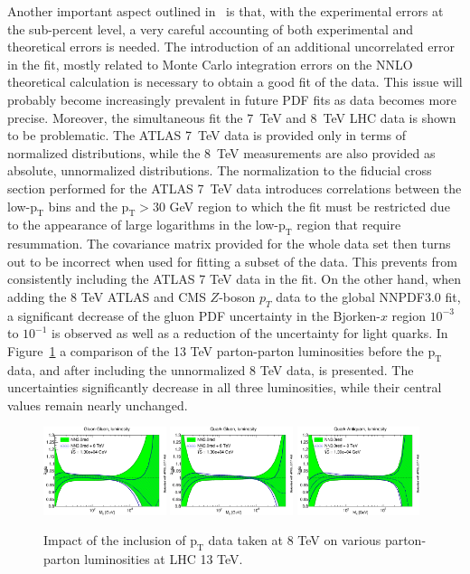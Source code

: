 \documentclass[a4paper,11pt,notoc]{article}
\newcommand{\pt}{\ensuremath{\mathrm{p_T}}}
\begin{document}
Another important aspect outlined in~\cite{Boughezal:2017nla} is that, 
with the experimental errors at the sub-percent level, a very careful 
accounting of both experimental and theoretical errors is needed. 
The introduction of an additional uncorrelated error in the fit, 
mostly related to Monte Carlo integration errors on the NNLO theoretical  
calculation is necessary to obtain a good fit of the data. 
This issue will probably become increasingly prevalent in future PDF 
fits as data becomes more precise.
%
Moreover, the simultaneous fit the 7~TeV and 8~TeV LHC data is shown to 
be problematic. 
The ATLAS 7~TeV data is provided only in terms of normalized distributions, 
while the 8~TeV measurements are also provided as absolute, unnormalized 
distributions. The normalization to the fiducial cross section performed 
for the ATLAS 7~TeV data introduces correlations between the low-$\pt$ 
bins and the $\pt>30$ GeV region to which the fit must be restricted due 
to the appearance of large logarithms in the low-$\pt$ region that require 
resummation.  
The covariance matrix provided for the whole data set then turns 
out to be incorrect when used for fitting a subset of the data. 
This prevents from consistently including the ATLAS 7 TeV data in the fit.
% 
On the other hand, when adding the 8 TeV ATLAS and CMS $Z$-boson $p_T$ data 
to the global NNPDF3.0 fit, a significant decrease of the gluon PDF 
uncertainty in the Bjorken-$x$ region $10^{-3}$ to $10^{-1}$ is observed
as well as a reduction of the uncertainty for light quarks.
In Figure~\ref{fig:lumi} a comparison of the 13 TeV parton-parton luminosities 
before the $\pt$ data, and after including the unnormalized 8 TeV data, 
is presented. The uncertainties significantly decrease in all three luminosities, 
while their central values remain nearly unchanged.
%
\begin{figure}[tbp]
        \centering
        \includegraphics[width=0.32\textwidth]{lumiGG_baselineP8tev.eps}
        \includegraphics[width=0.32\textwidth]{lumiQG_baselineP8tev.eps} 
        \includegraphics[width=0.32\textwidth]{lumiQQ_baselineP8tev.eps} 
        \caption{Impact of the inclusion of $\pt$ data taken at 8 TeV on
various parton-parton luminosities at LHC 13 TeV.\label{fig:lumi}}
\end{figure}
\end{document}
